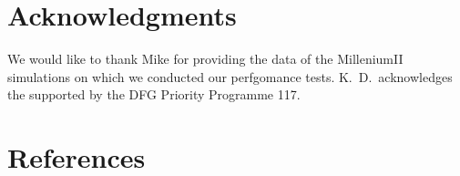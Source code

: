 \section*{Acknowledgments}
We would like to thank Mike for providing the data of the MilleniumII simulations 
on which we conducted our perfgomance tests. K.~D.~acknowledges the
supported by the DFG Priority Programme 117.

\section*{References}
















